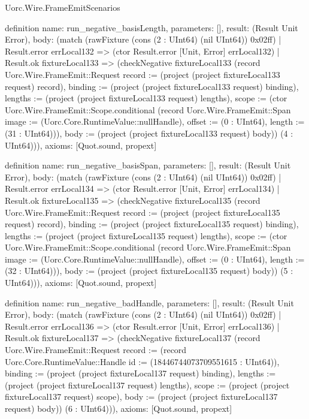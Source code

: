 \begin{lexlean}{Uorc.Wire.FrameEmitScenarios}
\begin{semanticmodule}
definition{
  name: run_negative_basisLength,
  parameters: [],
  result: (Result Unit Error),
  body: (match (rawFixture (cons (2 : UInt64) (nil UInt64)) 0x02ff)
    | Result.error errLocal132 => (ctor Result.error [Unit, Error] errLocal132)
    | Result.ok fixtureLocal133 => (checkNegative fixtureLocal133 (record Uorc.Wire.FrameEmit::Request {record := (project (project fixtureLocal133 request) record), binding := (project (project fixtureLocal133 request) binding), lengths := (project (project fixtureLocal133 request) lengths), scope := (ctor Uorc.Wire.FrameEmit::Scope.conditional (record Uorc.Wire.FrameEmit::Span {image := (Uorc.Core.RuntimeValue::nullHandle), offset := (0 : UInt64), length := (31 : UInt64)})), body := (project (project fixtureLocal133 request) body)}) (4 : UInt64))),
  axioms: [Quot.sound, propext]
}

definition{
  name: run_negative_basisSpan,
  parameters: [],
  result: (Result Unit Error),
  body: (match (rawFixture (cons (2 : UInt64) (nil UInt64)) 0x02ff)
    | Result.error errLocal134 => (ctor Result.error [Unit, Error] errLocal134)
    | Result.ok fixtureLocal135 => (checkNegative fixtureLocal135 (record Uorc.Wire.FrameEmit::Request {record := (project (project fixtureLocal135 request) record), binding := (project (project fixtureLocal135 request) binding), lengths := (project (project fixtureLocal135 request) lengths), scope := (ctor Uorc.Wire.FrameEmit::Scope.conditional (record Uorc.Wire.FrameEmit::Span {image := (Uorc.Core.RuntimeValue::nullHandle), offset := (0 : UInt64), length := (32 : UInt64)})), body := (project (project fixtureLocal135 request) body)}) (5 : UInt64))),
  axioms: [Quot.sound, propext]
}

definition{
  name: run_negative_badHandle,
  parameters: [],
  result: (Result Unit Error),
  body: (match (rawFixture (cons (2 : UInt64) (nil UInt64)) 0x02ff)
    | Result.error errLocal136 => (ctor Result.error [Unit, Error] errLocal136)
    | Result.ok fixtureLocal137 => (checkNegative fixtureLocal137 (record Uorc.Wire.FrameEmit::Request {record := (record Uorc.Core.RuntimeValue::Handle {id := (18446744073709551615 : UInt64)}), binding := (project (project fixtureLocal137 request) binding), lengths := (project (project fixtureLocal137 request) lengths), scope := (project (project fixtureLocal137 request) scope), body := (project (project fixtureLocal137 request) body)}) (6 : UInt64))),
  axioms: [Quot.sound, propext]
}


\end{semanticmodule}
\end{lexlean}
